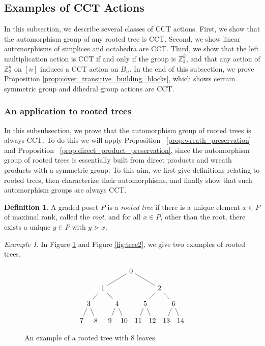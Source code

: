 \documentclass[smallextended, envcountsame, numbook]{svjour3}
\theoremstyle{plain}
\theoremstyle{definition}
\newtheorem{defn}[thm]{Definition}
\theoremstyle{remark}
\newtheorem{eg}[thm]{Example}
\numberwithin{equation}{section}
\newcommand\ssec{\subsection}
\newcommand\sssec{\subsubsection}
\begin{document}

\ssec{Examples of CCT Actions}\label{ssec:CCT_examples}

In this subsection, we describe several classes of CCT actions. First, we show that the automorphism group of any rooted tree is CCT. Second, we show linear automorphisms of simplices and octahedra are CCT. Third, we show that the left multiplication action is CCT if and only if the group is $\mathbb Z_2^k$, and that any action of $\mathbb Z_2^k$ on $[n]$ induces a CCT action on $B_n$. In the end of this subsection, we prove Proposition \ref{prop:cover_transitive_building_blocks}, which shows certain symmetric group and dihedral group actions are CCT.

\sssec{An application to rooted trees}
\label{ssec:rooted_trees}
In this subsubsection, we prove that the automorphism group of rooted trees is always CCT. To do this we will apply Proposition ~\ref{prop:wreath_preservation} and Proposition ~\ref{prop:direct_product_preservation}, since the automorphism group of rooted trees is essentially built from direct products and wreath products with a symmetric group. To this aim, we first give definitions relating to rooted trees, then characterize their automorphisms, and finally show that such automorphism groups are always CCT.

\begin{defn}
A graded poset $P$ is a {\it rooted tree} if there is a unique element $x \in P$ of maximal rank, called the {\it root}, and for all $x \in P$, other than the root, there exists a unique $y \in P$ with $y \gtrdot x$.
\end{defn}

\begin{eg}
In Figure \ref{fig:tree1} and Figure \ref{fig:tree2}, we give two examples of rooted trees.
\end{eg}
\begin{figure}[h!]
\[\begin{tikzpicture}[scale=.7]
  \node (0) at (-4,0) {$7$};
  \node (1) at (-3,0) {$8$};
  \node (2) at (-2,0) {$9$};
  \node (3) at (-1,0) {$10$};
    \node (4) at (0,0) {$11$};
  \node (5) at (1,0) {$12$};
  \node (6) at (2,0) {$13$};
  \node (7) at (3,0) {$14$};
  \node (8) at (-3.5,1.2) {$3$};
  \node (9) at (-1.5,1.2) {$4$};
  \node (10) at (.5,1.2) {$5$};
  \node (11) at (2.5,1.2) {$6$};
    \node (12) at (-2.5,2.3) {$1$};
  \node (13) at (1.5,2.3) {$2$};
  \node (14) at (-.5,3.5) {$0$};
  \draw (0)--(8);
  \draw (1)--(8);
  \draw (2)--(9);
  \draw (3)--(9);
  \draw (4)--(10);
  \draw (5)--(10);
  \draw (6)--(11);
  \draw (7)--(11);
  \draw (8)--(12);
  \draw (9)--(12);
  \draw (10)--(13);
  \draw (11)--(13);
  \draw (12)--(14);
  \draw (13)--(14);
\end{tikzpicture}\]
\caption{\label{fig:tree1} An example of a rooted tree with $8$ leaves}
\end{figure}
\end{document}
